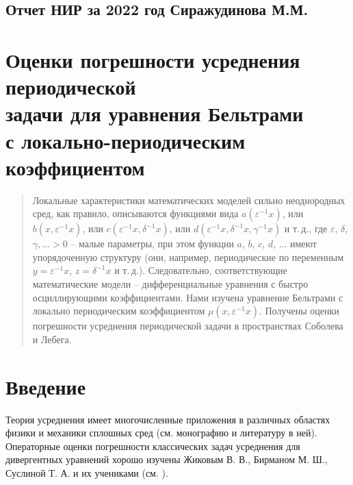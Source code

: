 \documentclass[a4paper,12pt]{article}
\theoremstyle{definition}
\begin{document}
\begin{center}
  \section*{Отчет НИР за 2022 год Сиражудинова М.М.}
\end{center}

\section{Оценки погрешности усреднения периодической \\ задачи  для уравнения Бельтрами\\
	с локально-периодическим коэффициентом}
\begin{abstract}
Локальные характеристики математических моделей сильно неоднородных сред, как правило, описываются функциями вида $a(\varepsilon^{-1} x)$, или $b(x,\varepsilon^{-1} x)$, или $c(\varepsilon^{-1} x,\delta^{-1} x)$, \linebreak или $d(\varepsilon^{-1} x,\delta^{-1} x,\gamma^{-1} x)$ и т.\,д., где $\varepsilon$, $\delta$,$\gamma,\ldots>0$ – малые параметры, при этом функции $a$, $b$, $c$, $d$, $\ldots$ имеют упорядоченную структуру (они, например, периодические по переменным $y=\varepsilon^{-1} x$, $z=\delta^{-1} x$  и т.\,д.). Следовательно, соответствующие математические модели – дифференциальные уравнения с быстро осциллирующими коэффициентами.
Нами изучена уравнение Бельтрами с локально периодическим коэффициентом $\mu(x,\varepsilon^{-1} x)$. Получены оценки
погрешности усреднения периодической задачи в пространствах Соболева и Лебега.
\end{abstract}



\section*{Введение}
        \bigskip

Теория усреднения имеет многочисленные приложения в различных областях физики и механики сплошных сред (см. монографию \cite{smm-1} и литературу в  ней). Операторные оценки погрешности классических задач усреднения для дивергентных уравнений хорошо изучены Жиковым В. В., Бирманом   М. Ш., Суслиной  Т. А. и их учениками (см. \cite{smm-2,smm-3}).
\end{document}
